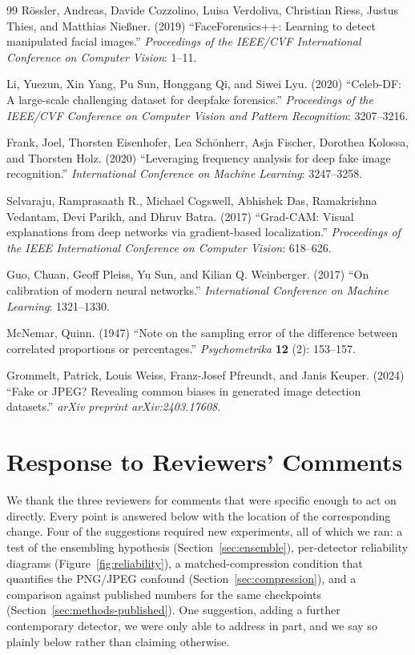 \documentclass[3p,times,procedia]{elsarticle}
\begin{document}
\begin{thebibliography}{99}
R\"{o}ssler, Andreas, Davide Cozzolino, Luisa Verdoliva, Christian Riess,
Justus Thies, and Matthias Nie{\ss}ner. (2019) ``FaceForensics++: Learning
to detect manipulated facial images.'' \textit{Proceedings of the IEEE/CVF
International Conference on Computer Vision}: 1--11.

Li, Yuezun, Xin Yang, Pu Sun, Honggang Qi, and Siwei Lyu. (2020)
``Celeb-DF: A large-scale challenging dataset for deepfake forensics.''
\textit{Proceedings of the IEEE/CVF Conference on Computer Vision and
Pattern Recognition}: 3207--3216.

Frank, Joel, Thorsten Eisenhofer, Lea Sch\"{o}nherr, Asja Fischer, Dorothea
Kolossa, and Thorsten Holz. (2020) ``Leveraging frequency analysis for
deep fake image recognition.'' \textit{International Conference on Machine
Learning}: 3247--3258.

Selvaraju, Ramprasaath R., Michael Cogswell, Abhishek Das, Ramakrishna
Vedantam, Devi Parikh, and Dhruv Batra. (2017) ``Grad-CAM: Visual
explanations from deep networks via gradient-based localization.''
\textit{Proceedings of the IEEE International Conference on Computer
Vision}: 618--626.

Guo, Chuan, Geoff Pleiss, Yu Sun, and Kilian Q. Weinberger. (2017) ``On
calibration of modern neural networks.'' \textit{International Conference
on Machine Learning}: 1321--1330.

McNemar, Quinn. (1947) ``Note on the sampling error of the difference
between correlated proportions or percentages.'' \textit{Psychometrika}
\textbf{12} (2): 153--157.

Grommelt, Patrick, Louis Weiss, Franz-Josef Pfreundt, and Janis Keuper.
(2024) ``Fake or JPEG? Revealing common biases in generated image
detection datasets.'' \textit{arXiv preprint arXiv:2403.17608}.

\end{thebibliography}

\clearpage
\section*{Response to Reviewers' Comments}

We thank the three reviewers for comments that were specific enough to act
on directly. Every point is answered below with the location of the
corresponding change. Four of the suggestions required new experiments,
all of which we ran: a test of the ensembling hypothesis
(Section~\ref{sec:ensemble}), per-detector reliability diagrams
(Figure~\ref{fig:reliability}), a matched-compression condition that
quantifies the PNG/JPEG confound (Section~\ref{sec:compression}), and a
comparison against published numbers for the same checkpoints
(Section~\ref{sec:methods-published}). One suggestion, adding a further
contemporary detector, we were only able to address in part, and we say so
plainly below rather than claiming otherwise.
\end{document}
